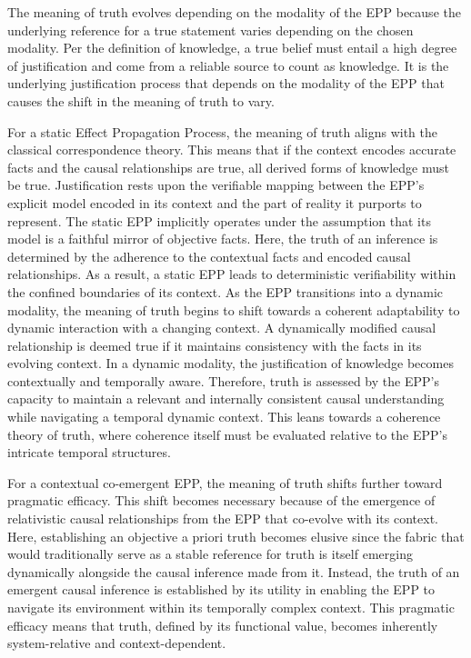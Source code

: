 The meaning of truth evolves depending on the modality of the EPP because the underlying reference for a true statement varies depending on the chosen modality. Per the definition of knowledge, a true belief must entail a high degree of justification and come from a reliable source to count as knowledge. It is the underlying justification process that depends on the modality of the EPP that causes the shift in the meaning of truth to vary.

For a static Effect Propagation Process, the meaning of truth aligns with the classical correspondence theory. This means that if the context encodes accurate facts and the causal relationships are true, all derived forms of knowledge must be true.
Justification rests upon the verifiable mapping between the EPP's explicit model encoded in its context and the part of reality it purports to represent. The static EPP implicitly operates under the assumption that its model is a faithful mirror of objective facts. Here, the truth of an inference is determined by the adherence to the contextual facts and encoded causal relationships. As a result, a static EPP leads to deterministic verifiability within the confined boundaries of its context.
As the EPP transitions into a dynamic modality, the meaning of truth begins to shift towards a coherent adaptability to dynamic interaction with a changing context. A dynamically modified causal relationship is deemed true if it maintains consistency with the facts in its evolving context. In a dynamic modality,  the justification of knowledge becomes contextually and temporally aware. Therefore, truth is assessed by the EPP's capacity to maintain a relevant and internally consistent causal understanding while navigating a temporal dynamic context.  This leans towards a coherence theory of truth, where coherence itself must be evaluated relative to the EPP’s intricate temporal structures.


For a contextual co-emergent EPP, the meaning of truth shifts further toward pragmatic efficacy. This shift becomes necessary because of the emergence of relativistic causal relationships from the EPP that co-evolve with its context. Here, establishing an objective a priori truth becomes elusive since the fabric that would traditionally serve as a stable reference for truth is itself emerging dynamically alongside the causal inference made from it. Instead, the truth of an emergent causal inference is established by its utility in enabling the EPP to navigate its environment within its temporally complex context.
This pragmatic efficacy means that truth, defined by its functional value, becomes inherently system-relative and context-dependent.

